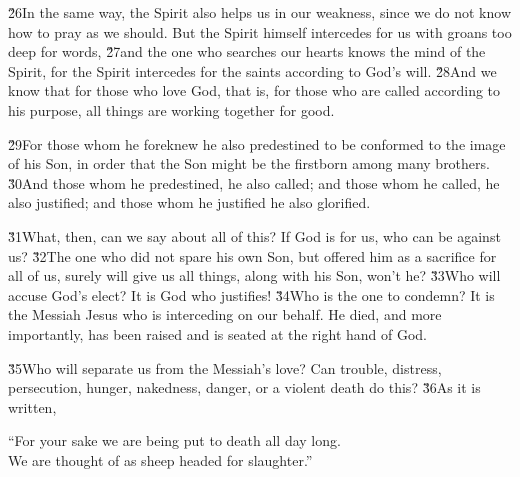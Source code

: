 \v{26}In the same way, the Spirit also helps us in our weakness, since we do not know how to pray as we should. But the Spirit himself intercedes for us with groans too deep for words, \v{27}and the one who searches our hearts knows the mind of the Spirit, for the Spirit intercedes for the saints according to God's will. \v{28}And we know that for those who love God, that is, for those who are called according to his purpose, all things are working together for good.

\v{29}For those whom he foreknew he also predestined to be conformed to the image of his Son, in order that the Son might be the firstborn among many brothers. \v{30}And those whom he predestined, he also called; and those whom he called, he also justified; and those whom he justified he also glorified.

\v{31}What, then, can we say about all of this? If God is for us, who can be against us? \v{32}The one who did not spare his own Son, but offered him as a sacrifice for all of us, surely will give us all things, along with his Son, won't he? \v{33}Who will accuse God's elect? It is God who justifies! \v{34}Who is the one to condemn? It is the Messiah Jesus who is interceding on our behalf. He died, and more importantly, has been raised and is seated at the right hand of God.

\v{35}Who will separate us from the Messiah's love? Can trouble, distress, persecution, hunger, nakedness, danger, or a violent death do this? \v{36}As it is written,

\begin{poetry}
\poeml ``For your sake we are being put to death all day long. \\
\poemll    We are thought of as sheep headed for slaughter.''
\end{poetry}

